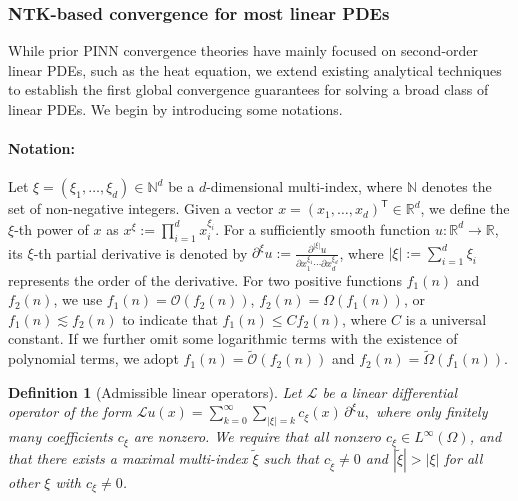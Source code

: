 \documentclass{article}
\newtheorem{definition}{Definition}
\newcommand{\T}{\mathsf{T}}
\begin{document}
\subsubsection{NTK-based convergence for most linear PDEs}\label{sec:convergence under linear case}
While prior PINN convergence theories have mainly focused on second-order linear PDEs, such as the heat equation, we extend existing analytical techniques to establish the first global convergence guarantees for solving a broad class of linear PDEs. 
We begin by introducing some notations.

\paragraph{Notation:}
Let \(\xi = (\xi_1, \ldots, \xi_d) \in \mathbb{N}^d\) be a \(d\)-dimensional multi-index, where \(\mathbb{N}\) denotes the set of non-negative integers. 
Given a vector \(x = (x_1, \ldots, x_d)^\T \in \mathbb{R}^d\), we define the \(\xi\)-th power of \(x\) as \(x^\xi := \prod_{i=1}^d x_i^{\xi_i}\). 
For a sufficiently smooth function \(u : \mathbb{R}^d \to \mathbb{R}\), its \(\xi\)-th partial derivative is denoted by \(\partial^\xi u := \frac{\partial^{|\xi|} u}{\partial x_1^{\xi_1} \cdots \partial x_d^{\xi_d}}\), where \(|\xi| := \sum_{i=1}^d \xi_i\) represents the order of the derivative.  
For two positive functions $f_1(n)$ and $f_2(n)$, we use $f_1(n) = \mathcal{O}(f_2(n))$, $f_2(n) = \Omega(f_1(n))$, or $f_1(n) \lesssim f_2(n)$ to indicate that $f_1(n) \leq C f_2(n)$, where $C$ is a universal constant. 
If we further omit some logarithmic terms with the existence of polynomial terms, we adopt $f_1(n) = \widetilde{\mathcal{O}}(f_2(n))$ and $f_2(n) = \widetilde{\Omega}(f_1(n))$.

\begin{definition}[Admissible linear operators]\label{def:ad lin op}
Let $\mathcal{L}$ be a linear differential operator of the form
$
\mathcal{L}u(x) = \sum_{k=0}^{\infty} \sum_{|\xi|=k} c_{\xi}(x)\, \partial^\xi u,
$
where only finitely many coefficients $c_{\xi}$ are nonzero.
We require that all nonzero $c_{\xi} \in L^\infty(\Omega)$, and that there exists a maximal multi-index $\tilde{\xi}$ such that $c_{\tilde{\xi}} \neq 0$ and $|\tilde{\xi}| > |\xi|$ for all other $\xi$ with $c_{\xi} \neq 0$.
\end{definition}
\end{document}
